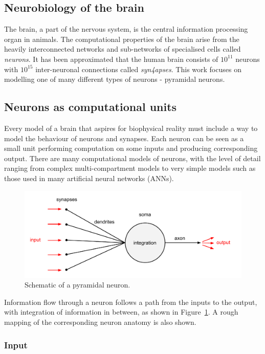 \documentclass[a4paper,12pt]{report}
\theoremstyle{definition}
\begin{document}
\subsection{Neurobiology of the brain}
The brain, a part of the nervous system, is the central information processing organ in animals. The computational properties of the brain arise from the heavily interconnected networks and sub-networks of specialised cells called \emph{neurons}. It has been approximated \cite{herculano2009human} that the human brain consists of $10^{11}$ neurons with $10^{15}$ inter-neuronal connections called \emph{syn4apses}. This work focuses on modelling one of many different types of neurons - pyramidal neurons.


\subsection{Neurons as computational units}
Every model of a brain that aspires for biophysical reality must include a way to model the behaviour of neurons and synapses. Each neuron can be seen as a small unit performing computation on some inputs and producing corresponding output. There are many computational models of neurons, with the level of detail ranging from complex multi-compartment models to very simple models such as those used in many artificial neural networks (ANNs). 

\begin{figure}[h]
    \includegraphics[width=\textwidth]{figures/fig1.pdf}
    \caption{Schematic of a pyramidal neuron.}
    \label{fig:pyramidal}
\end{figure}

Information flow through a neuron follows a path from the inputs to the output, with integration of information in between, as shown in Figure~\ref{fig:pyramidal}. A rough mapping of the corresponding neuron anatomy is also shown.


\subsubsection{Input}
\end{document}
